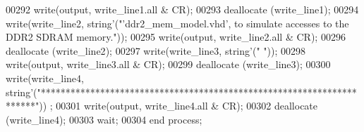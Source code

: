 \begin{DoxyCode}
00292       \textcolor{vhdlchar}{write}\textcolor{vhdlchar}{(}\textcolor{vhdlchar}{output}\textcolor{vhdlchar}{,} \textcolor{vhdlchar}{write\_line1}\textcolor{vhdlchar}{.}\textcolor{keywordflow}{all} \textcolor{vhdlchar}{&} \textcolor{vhdlchar}{CR}\textcolor{vhdlchar}{)};
00293       \textcolor{vhdlchar}{deallocate} \textcolor{vhdlchar}{(}\textcolor{vhdlchar}{write\_line1}\textcolor{vhdlchar}{)};
00294       \textcolor{vhdlchar}{write}\textcolor{vhdlchar}{(}\textcolor{vhdlchar}{write\_line2}\textcolor{vhdlchar}{,} \textcolor{comment}{string}\textcolor{vhdlchar}{'}\textcolor{vhdlchar}{(}\textcolor{keyword}{"'ddr2\_mem\_model.vhd', to simulate accesses to the DDR2 SDRAM memory."}\textcolor{vhdlchar}{)}\textcolor{vhdlchar}{)};
00295       \textcolor{vhdlchar}{write}\textcolor{vhdlchar}{(}\textcolor{vhdlchar}{output}\textcolor{vhdlchar}{,} \textcolor{vhdlchar}{write\_line2}\textcolor{vhdlchar}{.}\textcolor{keywordflow}{all} \textcolor{vhdlchar}{&} \textcolor{vhdlchar}{CR}\textcolor{vhdlchar}{)};
00296       \textcolor{vhdlchar}{deallocate} \textcolor{vhdlchar}{(}\textcolor{vhdlchar}{write\_line2}\textcolor{vhdlchar}{)};
00297       \textcolor{vhdlchar}{write}\textcolor{vhdlchar}{(}\textcolor{vhdlchar}{write\_line3}\textcolor{vhdlchar}{,} \textcolor{comment}{string}\textcolor{vhdlchar}{'}\textcolor{vhdlchar}{(}\textcolor{keyword}{" "}\textcolor{vhdlchar}{)}\textcolor{vhdlchar}{)};
00298       \textcolor{vhdlchar}{write}\textcolor{vhdlchar}{(}\textcolor{vhdlchar}{output}\textcolor{vhdlchar}{,} \textcolor{vhdlchar}{write\_line3}\textcolor{vhdlchar}{.}\textcolor{keywordflow}{all} \textcolor{vhdlchar}{&} \textcolor{vhdlchar}{CR}\textcolor{vhdlchar}{)};
00299       \textcolor{vhdlchar}{deallocate} \textcolor{vhdlchar}{(}\textcolor{vhdlchar}{write\_line3}\textcolor{vhdlchar}{)};
00300       \textcolor{vhdlchar}{write}\textcolor{vhdlchar}{(}\textcolor{vhdlchar}{write\_line4}\textcolor{vhdlchar}{,} \textcolor{comment}{string}\textcolor{vhdlchar}{'}\textcolor{vhdlchar}{(}\textcolor{keyword}{"**********************************************************************"}\textcolor{vhdlchar}{)}\textcolor{vhdlchar}{)}
      ;
00301       \textcolor{vhdlchar}{write}\textcolor{vhdlchar}{(}\textcolor{vhdlchar}{output}\textcolor{vhdlchar}{,} \textcolor{vhdlchar}{write\_line4}\textcolor{vhdlchar}{.}\textcolor{keywordflow}{all} \textcolor{vhdlchar}{&} \textcolor{vhdlchar}{CR}\textcolor{vhdlchar}{)};
00302       \textcolor{vhdlchar}{deallocate} \textcolor{vhdlchar}{(}\textcolor{vhdlchar}{write\_line4}\textcolor{vhdlchar}{)};
00303     \textcolor{keywordflow}{wait};
00304   \textcolor{keywordflow}{end} \textcolor{keywordflow}{process};

\end{DoxyCode}
